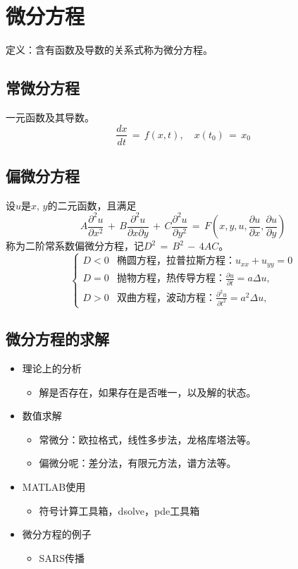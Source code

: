 \section{微分方程}
定义：含有函数及导数的关系式称为微分方程。
\subsection{常微分方程}
一元函数及其导数。
$$\frac{dx}{dt}\,=\,f(x,t),\quad{}x(t_0)\,=\,x_0$$

\subsection{偏微分方程}
设$u$是$x,\,y$的二元函数，且满足
$$A\frac{\partial^2u}{\partial{}x^2}\,+\,B\frac{\partial^2u}{\partial{}x\partial{}y}\,+\,C\frac{\partial^2u}{\partial{}y^2}\,=\,F(x,y,u,\frac{\partial u}{\partial x},\frac{\partial u}{\partial y})$$
称为二阶常系数偏微分方程，记$D^2\,=\,B^2\,-\,4 A C$。
\begin{equation*}
\begin{cases}
D<0 & \text{椭圆方程，拉普拉斯方程：$u_{xx}+u_{yy}=0$}\\
D=0 & \text{抛物方程，热传导方程：$\frac{\partial u}{\partial t}=a\Delta u$},\, \\
D>0 & \text{双曲方程，波动方程：$\frac{\partial^2u}{\partial t^2}=a^2\Delta u$},\,
\end{cases}
\end{equation*}

\subsection{微分方程的求解}
\begin{itemize}
\item 理论上的分析
    \begin{itemize}
    \item 解是否存在，如果存在是否唯一，以及解的状态。
    \end{itemize}
\item 数值求解
    \begin{itemize}
    \item 常微分：欧拉格式，线性多步法，龙格库塔法等。
    \item 偏微分呢：差分法，有限元方法，谱方法等。
    \end{itemize}
\item MATLAB使用
    \begin{itemize}
    \item 符号计算工具箱，dsolve，pde工具箱
    \end{itemize}
\item 微分方程的例子
    \begin{itemize}
    \item SARS传播
    \end{itemize}
\end{itemize}

